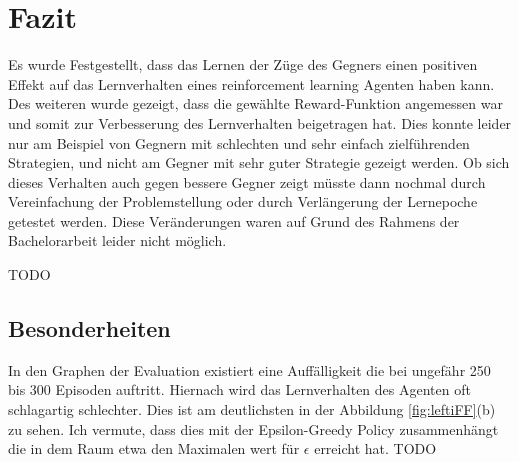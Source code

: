 \chapter{Fazit}%

\label{cha:Fazit}
Es wurde Festgestellt, dass das Lernen der Züge des Gegners einen positiven Effekt auf das Lernverhalten eines reinforcement learning Agenten haben kann. 
Des weiteren wurde gezeigt, dass die  gewählte Reward-Funktion angemessen war und somit zur Verbesserung des Lernverhalten beigetragen hat.
Dies konnte leider nur am Beispiel von Gegnern mit schlechten und sehr einfach zielführenden Strategien, und nicht am Gegner mit sehr guter Strategie gezeigt werden.
Ob sich dieses Verhalten auch gegen bessere Gegner zeigt müsste dann nochmal durch Vereinfachung der Problemstellung oder durch Verlängerung der Lernepoche getestet werden.
Diese Veränderungen waren auf Grund des Rahmens der Bachelorarbeit leider nicht möglich.


\colorbox{red!30}{TODO}
\section{Besonderheiten}
In den Graphen der Evaluation existiert eine Auffälligkeit die bei ungefähr 250 bis 300 Episoden auftritt. Hiernach wird das Lernverhalten des Agenten oft schlagartig schlechter. Dies ist am deutlichsten in der Abbildung \ref{fig:leftiFF}(b) zu sehen. Ich vermute, dass dies mit der Epsilon-Greedy Policy zusammenhängt die in dem Raum etwa den Maximalen wert für $\epsilon$ erreicht hat.
\colorbox{red!30}{TODO}

